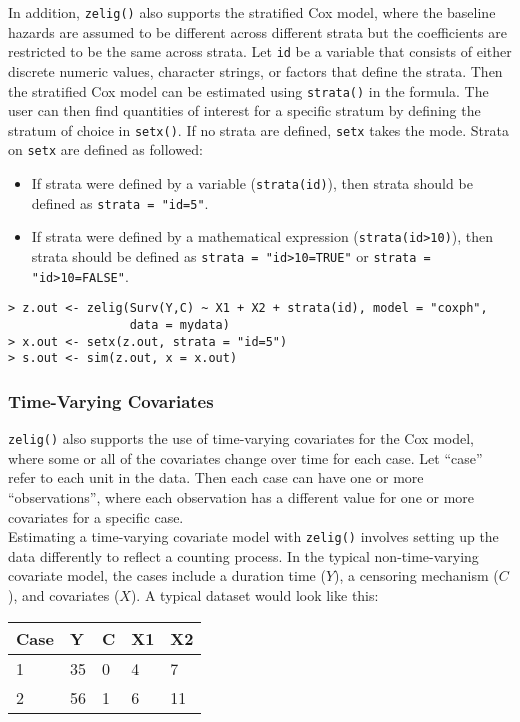 In addition, {\tt zelig()} also supports the stratified Cox model, where the baseline hazards are assumed to be different across different strata but the coefficients are restricted to be the same across strata.  Let {\tt id} be a variable that consists of either discrete numeric values, character strings, or factors that define the strata.  Then the stratified Cox model can be estimated using {\tt strata()} in the formula.  The user can then find quantities of interest for a specific stratum by defining the stratum of choice in {\tt setx()}.  If no strata are defined, {\tt setx} takes the mode.  Strata on {\tt setx} are defined as followed:

\begin{itemize}
\item If strata were defined by a variable ({\tt strata(id)}), then strata should be defined as {\tt strata = "id=5"}.
\item If strata were defined by a mathematical expression ({\tt strata(id>10)}), then strata should be defined as {\tt strata = "id>10=TRUE"} or {\tt strata = "id>10=FALSE"}.
\end{itemize}

\begin{verbatim}
> z.out <- zelig(Surv(Y,C) ~ X1 + X2 + strata(id), model = "coxph", 
                 data = mydata)
> x.out <- setx(z.out, strata = "id=5")
> s.out <- sim(z.out, x = x.out)
\end{verbatim}


\subsubsection{Time-Varying Covariates}

{\tt zelig()} also supports the use of time-varying covariates for the Cox model, where some or all of the covariates change over time for each case.  Let ``case'' refer to each unit in the data.  Then each case can have one or more ``observations'', where each observation has a different value for one or more covariates for a specific case.  \\ 

\noindent Estimating a time-varying covariate model with {\tt zelig()} involves setting up the data differently to reflect a counting process.  In the typical non-time-varying covariate model, the cases include a duration time ($Y$), a censoring mechanism ($C$), and covariates ($X$).  A typical dataset would look like this:

\begin{table}[!htp]
 \begin{center}
\begin{tabular}{lllll}
\hline
Case & Y & C & X1 & X2 \\ 
\hline
1 & 35 & 0 & 4 & 7 \\ 
2 & 56 & 1 & 6 & 11\\
\hline
\end{tabular}
 \end{center}
\end{table}

